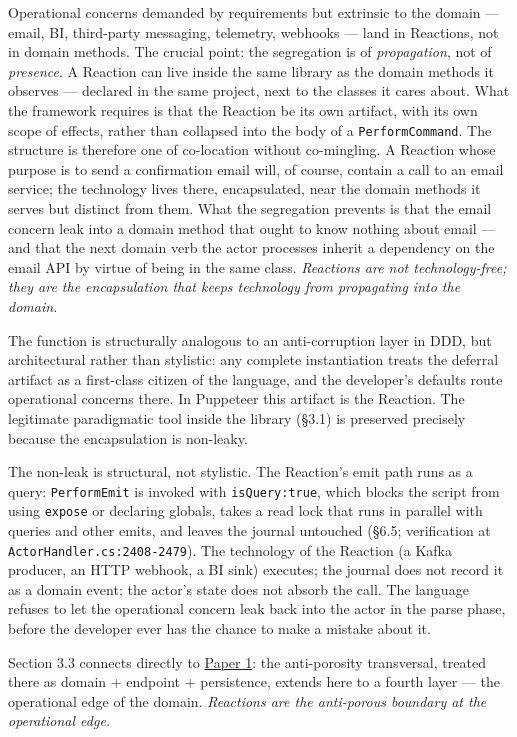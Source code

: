 \documentclass[
]{article}
\let\origtexttt\texttt%
\renewcommand{\texttt}[1]{\origtexttt{\seqsplit{#1}}}%
\let\texttt\origtexttt%
\begin{document}
Operational concerns demanded by requirements but extrinsic to the
domain --- email, BI, third-party messaging, telemetry, webhooks ---
land in Reactions, not in domain methods. The crucial point: the
segregation is of \emph{propagation}, not of \emph{presence}. A Reaction
can live inside the same library as the domain methods it observes ---
declared in the same project, next to the classes it cares about. What
the framework requires is that the Reaction be its own artifact, with
its own scope of effects, rather than collapsed into the body of a
\texttt{PerformCommand}. The structure is therefore one of co-location
without co-mingling. A Reaction whose purpose is to send a confirmation
email will, of course, contain a call to an email service; the
technology lives there, encapsulated, near the domain methods it serves
but distinct from them. What the segregation prevents is that the email
concern leak into a domain method that ought to know nothing about email
--- and that the next domain verb the actor processes inherit a
dependency on the email API by virtue of being in the same class.
\emph{Reactions are not technology-free; they are the encapsulation that
keeps technology from propagating into the domain.}

The function is structurally analogous to an anti-corruption layer in
DDD, but architectural rather than stylistic: any complete instantiation
treats the deferral artifact as a first-class citizen of the language,
and the developer's defaults route operational concerns there. In
Puppeteer this artifact is the Reaction. The legitimate paradigmatic
tool inside the library (§3.1) is preserved precisely because the
encapsulation is non-leaky.

The non-leak is structural, not stylistic. The Reaction's emit path runs
as a query: \texttt{PerformEmit} is invoked with \texttt{isQuery:true},
which blocks the script from using \texttt{expose} or declaring globals,
takes a read lock that runs in parallel with queries and other emits,
and leaves the journal untouched (§6.5; verification at
\texttt{ActorHandler.cs:2408-2479}). The technology of the Reaction (a
Kafka producer, an HTTP webhook, a BI sink) executes; the journal does
not record it as a domain event; the actor's state does not absorb the
call. The language refuses to let the operational concern leak back into
the actor in the parse phase, before the developer ever has the chance
to make a mistake about it.

Section 3.3 connects directly to \href{01-anti-porosity.md}{Paper 1}:
the anti-porosity transversal, treated there as domain + endpoint +
persistence, extends here to a fourth layer --- the operational edge of
the domain. \emph{Reactions are the anti-porous boundary at the
operational edge.}
\end{document}
